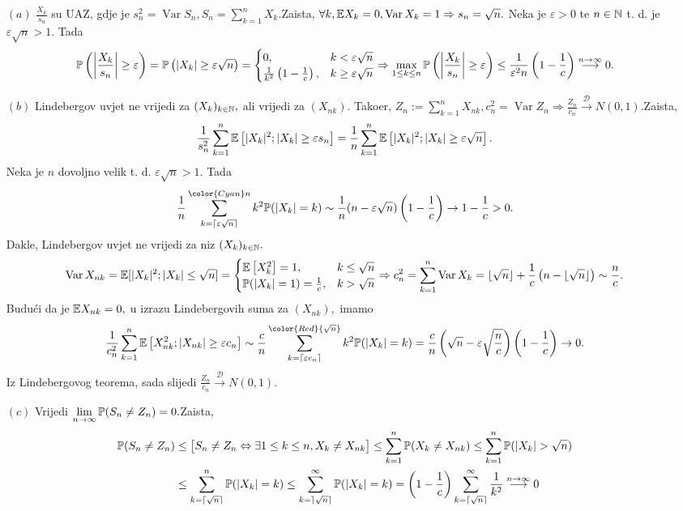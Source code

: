 \documentclass{article}
\newcommand{\Var}{\operatorname{Var}}
\begin{document}
\begin{enumerate}
    \item[\((a)\)] \(\frac{X_k}{s_n}\) su UAZ, gdje je \(s_n^2=\Var S_n,S_n=\sum_{k=1}^nX_k.\)\newline Zaista, \(\forall k,\Bbb EX_k=0,\Var X_k=1\Rightarrow s_n=\sqrt n.\) Neka je \(\varepsilon>0\) te \(n\in\Bbb N\) t. d. je \(\varepsilon\sqrt n>1.\) Tada \[\Bbb P\left(\left|\frac{X_k}{s_n}\right|\ge\varepsilon\right)=\Bbb P\left(|X_k|\ge\varepsilon\sqrt n\right)=\begin{cases}0,&k<\varepsilon\sqrt n\\\frac1{k^2}\left(1-\frac1c\right),&k\ge\varepsilon\sqrt n\end{cases}\Rightarrow\max_{1\le k\le n}\Bbb P\left(\left|\frac{X_k}{s_n}\right|\ge\varepsilon\right)\le\frac1{\varepsilon^2n}\left(1-\frac1c\right)\overset{n\to\infty}{\longrightarrow}0.\]
    \item[\((b)\)] Lindebergov uvjet ne vrijedi za \((X_k)_{k\in\Bbb N},\) ali vrijedi za \((X_{nk}).\) Tako\dj{}er, \(Z_n:=\sum_{k=1}^nX_{nk},c_n^2=\Var Z_n\Rightarrow\frac{Z_n}{c_n}\overset{\mathcal D}{\longrightarrow}N(0,1).\)\newline Zaista, \[\frac1{s_n^2}\sum_{k=1}^n\Bbb E\left[|X_k|^2;|X_k|\ge\varepsilon s_n\right]=\frac1n\sum_{k=1}^n\Bbb E\left[|X_k|^2;|X_k|\ge\varepsilon\sqrt n\right].\] Neka je \(n\) dovoljno velik t. d. \(\varepsilon\sqrt n>1.\) Tada \[\frac1n\sum_{k=\lceil\varepsilon\sqrt n\rceil}^{{\color{Cyan}n}}k^2\Bbb P(|X_k|=k)\sim\frac1n(n-\varepsilon\sqrt n)\left(1-\frac1c\right)\to1-\frac1c>0.\] Dakle, Lindebergov uvjet ne vrijedi za niz \((X_k)_{k\in\Bbb N}.\) \[\Var X_{nk}=\Bbb E[|X_k|^2;|X_k|\le\sqrt n]=\begin{cases}\Bbb E\left[X_k^2\right]=1,&k\le\sqrt n\\\Bbb P(|X_k|=1)=\frac1c,&k>\sqrt n\end{cases}\Rightarrow c_n^2=\sum_{k=1}^n\Var X_k=\lfloor\sqrt n\rfloor+\frac1c\left(n-\lfloor\sqrt n\rfloor\right)\sim\frac{n}c.\] Budući da je \(\Bbb EX_{nk}=0,\) u izrazu Lindebergovih suma za \((X_{nk}),\) imamo \[\frac1{c_n^2}\sum_{k=1}^n\Bbb E\left[X_{nk}^2;|X_{nk}|\ge\varepsilon c_n\right]\sim\frac{c}n\sum_{k=\lceil\varepsilon c_n\rceil}^{{\color{Red}{\sqrt n}}}k^2\Bbb P(|X_k|=k)=\frac{c}n\left(\sqrt n-\varepsilon\sqrt{\frac{n}c}\right)\left(1-\frac1c\right)\to0.\] Iz Lindebergovog teorema, sada slijedi \(\frac{Z_n}{c_n}\overset{\mathcal D}{\longrightarrow}N(0,1).\) 
    \item[\((c)\)] Vrijedi \(\lim\limits_{n\to\infty}\Bbb P(S_n\ne Z_n)=0.\)\newline Zaista, \[\begin{aligned}\Bbb P(S_n\ne Z_n)&\le\begin{bmatrix}S_n\ne Z_n\Leftrightarrow\exists1\le k\le n,X_k\ne X_{nk}\end{bmatrix}\le\sum_{k=1}^n\Bbb P(X_k\ne X_{nk})\le\sum_{k=1}^n\Bbb P(|X_k|>\sqrt n)\\&\le\sum_{k=\lceil\sqrt n\rceil}^n\Bbb P(|X_k|=k)\le\sum_{k=\rceil\sqrt n\rceil}^\infty\Bbb P(|X_k|=k)=\left(1-\frac1c\right)\sum_{k=\lceil\sqrt n\rceil}^\infty\frac1{k^2}\overset{n\to\infty}{\longrightarrow}0\end{aligned}\]

\end{enumerate}
\end{document}
